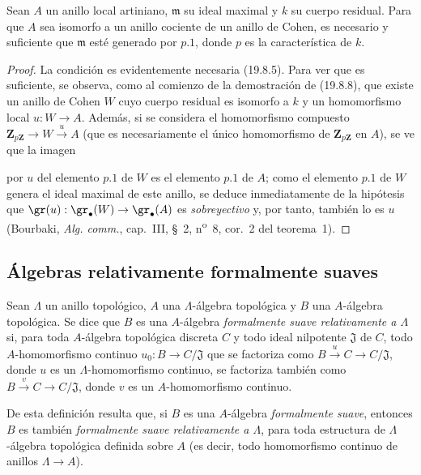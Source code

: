 \begin{proposition}[19.8.11]
\label{0.19.8.11-fr}
Sean $A$ un anillo local artiniano, $\mathfrak m$ su ideal maximal y $k$ su
cuerpo residual. Para que $A$ sea isomorfo a un anillo cociente de un anillo
de Cohen, es necesario y suficiente que $\mathfrak m$ esté generado por
$p.1$, donde $p$ es la característica de $k$.
\end{proposition}

\begin{proof}
La condición es evidentemente necesaria (19.8.5). Para ver que es suficiente,
se observa, como al comienzo de la demostración de (19.8.8), que existe un
anillo de Cohen $W$ cuyo cuerpo residual es isomorfo a $k$ y un homomorfismo
local $u:W\to A$. Además, si se considera el homomorfismo compuesto
$\mathbf Z_{p\mathbf Z}\to W\xrightarrow{u}A$ (que es necesariamente el único
homomorfismo de $\mathbf Z_{p\mathbf Z}$ en $A$), se ve que la imagen


por $u$ del elemento $p.1$ de $W$ es el elemento $p.1$ de $A$; como
el elemento $p.1$ de $W$ genera el ideal maximal de este anillo, se deduce
inmediatamente de la hipótesis que
$\gr(u):\gr_\bullet(W)\to\gr_\bullet(A)$ es \emph{sobreyectivo} y, por tanto, también
lo es $u$ (Bourbaki, \emph{Alg. comm.}, cap.~III, §~2,
n\textsuperscript{o}~8, cor.~2 del teorema~1).
\end{proof}
\subsection{Álgebras relativamente formalmente suaves}
\label{subsection:0.19.9-fr}

\begin{definition}[19.9.1]
\label{0.19.9.1-fr}
Sean $\Lambda$ un anillo topológico, $A$ una $\Lambda$-álgebra topológica y
$B$ una $A$-álgebra topológica. Se dice que $B$ es una $A$-álgebra
\emph{formalmente suave relativamente a $\Lambda$} si, para toda $A$-álgebra
topológica discreta $C$ y todo ideal nilpotente $\mathfrak J$ de $C$, todo
$A$-homomorfismo continuo $u_0:B\to C/\mathfrak J$ que se factoriza como
$B\xrightarrow{u}C\to C/\mathfrak J$, donde $u$ es un \textup{$\Lambda$-homomorfismo}
continuo, se factoriza también como $B\xrightarrow{v}C\to C/\mathfrak J$, donde
$v$ es un \textup{$A$-homomorfismo} continuo.
\end{definition}

De esta definición resulta que, si $B$ es una $A$-álgebra \emph{formalmente
suave}, entonces $B$ es también \emph{formalmente suave relativamente a
$\Lambda$}, para toda estructura de $\Lambda$-álgebra topológica definida sobre
$A$ (es decir, todo homomorfismo continuo de anillos $\Lambda\to A$).

